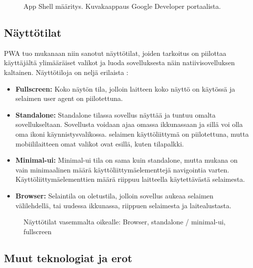 \documentclass{tktltiki}
\begin{document}
\begin{figure}[h]
\begin{center}
\caption{App Shell määritys. Kuvakaappaus Google Developer portaalista. }
\label{Service workerin toiminta}
\end{center}
\end{figure}
\clearpage


\subsection{Näyttötilat}

PWA tuo mukanaan niin sanotut näyttötilat, joiden tarkoitus on piilottaa käyttäjältä ylimääräiset valikot ja luoda sovelluksesta näin natiivisovelluksen kaltainen. Näyttötiloja on neljä erilaista \cite{Mozilla}:

\begin{itemize}
  \item \textbf{Fullscreen:} Koko näytön tila, jolloin laitteen koko näyttö on käytössä ja selaimen user agent on piilotettuna.
  \item \textbf{Standalone:} Standalone tilassa sovellus näyttää ja tuntuu omalta sovellukseltaan. Sovellusta voidaan ajaa omassa ikkunassaan ja sillä voi olla oma ikoni käynnistysvalikossa. selaimen käyttöliittymä on piilotettuna, mutta mobiililaitteen omat valikot ovat esillä, kuten tilapalkki. 
  \item \textbf{Minimal-ui:} Minimal-ui tila on sama kuin standalone, mutta mukana on vain minimaalinen määrä käyttöliittymäelementtejä navigointia varten. Käyttöliittymäelementtien määrä riippuu laitteella käytettävästä selaimesta. 
  \item \textbf{Browser:} Selaintila on oletustila, jolloin sovellus aukeaa selaimen välilehdellä, tai uudessa ikkunassa, riippuen selaimesta ja laitealustasta. 
\end{itemize}

\begin{figure}[h]
\begin{center}
\caption{Näyttötilat vasemmalta oikealle: Browser, standalone / minimal-ui, fullscreen}
\label{Näyttötilat}
\end{center}
\end{figure}
\clearpage

\subsection{Muut teknologiat ja erot}
\end{document}
